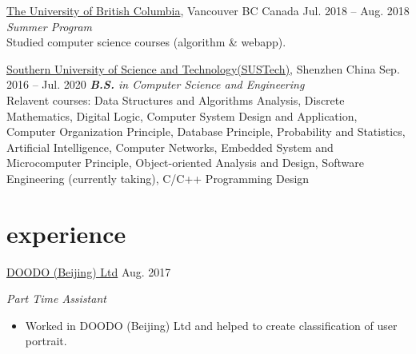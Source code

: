 \documentclass[hidelinks__VERSION__]{adamyi-cv}
\begin{document}
\begin{entrylist}


\entry
{\href{https://www.ubc.ca/}{The University of British Columbia}, Vancouver BC Canada}
{Jul. 2018 -- Aug. 2018}
{\emph{Summer Program}\\
Studied computer science courses (algorithm \& webapp).
}


\entry
{\href{https://www.sustech.edu.cn/}{Southern University of Science and Technology(SUSTech)}, Shenzhen China}
{Sep. 2016 -- Jul. 2020}
{\emph{\textbf{B.S.} in Computer Science and Engineering}\\
Relavent courses: Data Structures and Algorithms Analysis, Discrete Mathematics, Digital Logic, Computer System Design and Application, Computer Organization Principle, Database Principle, Probability and Statistics, Artificial Intelligence, Computer Networks, Embedded System and Microcomputer Principle, Object-oriented Analysis and Design, Software Engineering (currently taking), C/C++ Programming Design
}

\end{entrylist}


\section{experience}

\begin{entrylist}


\entry
{\href{http://www.doodod.com/}{DOODO (Beijing) Ltd}}
{Aug. 2017}
{\emph{Part Time Assistant}
\begin{itemize}
\item Worked in DOODO (Beijing) Ltd and helped to create classification of user portrait.
\end{itemize}}


\end{entrylist}

\end{document}
